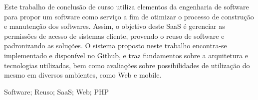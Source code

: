 Este trabalho de conclusão de curso utiliza elementos da engenharia de software para propor um software como serviço a fim de otimizar o processo de construção e manutenção dos softwares. Assim, o objetivo deste SaaS é gerenciar as permissões de acesso de sistemas cliente, provendo o reuso de software e padronizando as soluções. O sistema proposto neste trabalho encontra-se implementado e disponível no Github, e traz fundamentos sobre a arquitetura e tecnologias utilizadas, bem como avaliações sobre possibilidades de utilização do mesmo em diversos ambientes, como Web e mobile.

\begin{keywords}
Software; Reuso; SaaS; Web; PHP
\end{keywords}